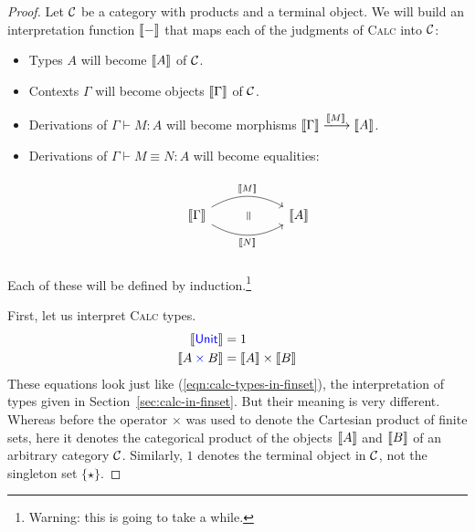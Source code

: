 \begin{proof}
  Let \(\mathcal C\) be a category with products and a terminal object.
  We will build an interpretation function \(\left\llbracket -\right\rrbracket\)
  that maps each of the judgments of \textsc{Calc}
  into \(\mathcal C\):
  \begin{itemize}
  \item Types \(A\) will become \(\left\llbracket A\right\rrbracket\) of \(\mathcal C\).
  \item Contexts \(\Gamma\) will become objects \(\left\llbracket \Gamma\right\rrbracket\) of \(\mathcal C\).
  \item Derivations of \(\Gamma \vdash M : A\) will become
    morphisms \(\llbr{\Gamma} \xlongrightarrow{\llbr{M}} \llbr{A}\).
  \item Derivations of \(\Gamma \vdash M \equiv N : A\) will become
    equalities:
    \[%
\begin{tikzcd}
                                                                                    & {} \arrow[dd, "~\rotatebox{90}{\(=\)}", phantom] &          \\
\llbr{\Gamma} \arrow[rr, "\llbr{M}", bend left] \arrow[rr, "\llbr{N}"', bend right] &                                                  & \llbr{A} \\
                                                                                    & {}                                               &
\end{tikzcd}\]
  \end{itemize}
  Each of these will be defined by induction.\footnote{
  Warning: this is going to take a while.
  }

  First, let us interpret \textsc{Calc} types.
  \begin{align}
    \left\llbracket \mathsf{{\color{blue}Unit}}\right\rrbracket &= 1 \\
    \left\llbracket A \mathbin{{\color{blue}\times}} B\right\rrbracket &= \left\llbracket A\right\rrbracket \times \left\llbracket B\right\rrbracket
  \end{align}
  These equations look just like
  (\ref{eqn:calc-types-in-finset}), the interpretation
  of types given in Section~\ref{sec:calc-in-finset}.
  But their meaning is very different.
  Whereas before the operator \(\times\) was used
  to denote the Cartesian product of finite sets,
  here it denotes the categorical
  product of the objects \(\left\llbracket A\right\rrbracket\) and \(\left\llbracket B\right\rrbracket\)
  of an arbitrary category \(\mathcal C\).
  Similarly, \(1\) denotes the terminal object in \(\mathcal C\),
  not the singleton set \(\{\star\}\).


\end{proof}
